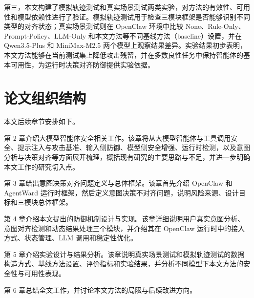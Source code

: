第三，本文构建了模拟轨迹测试和真实场景测试两类实验，对方法的有效性、可用性和模型依赖性进行了验证。模拟轨迹测试用于检查三模块框架是否能够识别不同类型的对齐状态；真实场景测试则在 OpenClaw 环境中比较 None、Rule-Only、Prompt-Policy、LLM-Only 和本文方法等不同基线方法（baseline）设置，并在 Qwen3.5-Plus 和 MiniMax-M2.5 两个模型上观察结果差异。实验结果初步表明，本文方法能够在当前测试集上降低攻击残留，并在多数良性任务中保持智能体的基本可用性，为运行时决策对齐防御提供实验依据。

\section{论文组织结构}

本文后续章节安排如下。

第 2 章介绍大模型智能体安全相关工作。该章将从大模型智能体与工具调用安全、提示注入与攻击基准、输入侧防御、模型侧安全增强、运行时检测，以及意图分析与决策对齐等方面展开梳理，概括现有研究的主要思路与不足，并进一步明确本文工作的研究切入点。

第 3 章给出意图决策对齐问题定义与总体框架。该章首先介绍 OpenClaw 和 AgentWard 运行时框架，然后定义意图决策不对齐问题，说明风险来源、设计目标和三模块总体框架。

第 4 章介绍本文提出的防御机制设计与实现。该章详细说明用户真实意图分析、意图对齐检测和动态结果处理三个模块，并介绍其在 OpenClaw 运行时中的接入方式、状态管理、LLM 调用和稳定性优化。

第 5 章介绍实验设计与结果分析。该章说明真实场景测试和模拟轨迹测试的数据构造方式、基线方法设置、评价指标和实验结果，并分析不同模型下本文方法的安全性与可用性表现。

第 6 章总结全文工作，并讨论本文方法的局限与后续改进方向。
